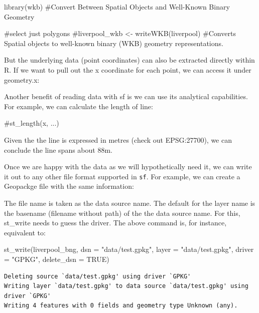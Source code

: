 \documentclass[
  letterpaper,
  DIV=11,
  numbers=noendperiod]{scrreprt}
\newenvironment{Shaded}{\begin{snugshade}}{\end{snugshade}}
\newcommand{\AttributeTok}[1]{\textcolor[rgb]{0.40,0.45,0.13}{#1}}
\newcommand{\CommentTok}[1]{\textcolor[rgb]{0.37,0.37,0.37}{#1}}
\newcommand{\ConstantTok}[1]{\textcolor[rgb]{0.56,0.35,0.01}{#1}}
\newcommand{\FunctionTok}[1]{\textcolor[rgb]{0.28,0.35,0.67}{#1}}
\newcommand{\NormalTok}[1]{\textcolor[rgb]{0.00,0.23,0.31}{#1}}
\newcommand{\StringTok}[1]{\textcolor[rgb]{0.13,0.47,0.30}{#1}}
\begin{document}
\begin{Shaded}
\begin{Highlighting}[]
\FunctionTok{library}\NormalTok{(wkb) }\CommentTok{\#Convert Between Spatial Objects and Well{-}Known Binary Geometry}

\CommentTok{\#select just polygons}
\CommentTok{\#liverpool\_wkb \textless{}{-} writeWKB(liverpool) \#Converts Spatial objects to well{-}known binary (WKB) geometry representations.}
\end{Highlighting}
\end{Shaded}

But the underlying data (point coordinates) can also be extracted
directly within R. If we want to pull out the x coordinate for each
point, we can access it under geometry.x:

Another benefit of reading data with sf is we can use its analytical
capabilities. For example, we can calculate the length of line:

\begin{Shaded}
\begin{Highlighting}[]
\CommentTok{\#st\_length(x, ...)}
\end{Highlighting}
\end{Shaded}

Given the the line is expressed in metres (check out EPSG:27700), we can
conclude the line spans about 88m.

Once we are happy with the data as we will hypothetically need it, we
can write it out to any other file format supported in \texttt{sf}. For
example, we can create a Geopackge file with the same information:

The file name is taken as the data source name. The default for the
layer name is the basename (filename without path) of the the data
source name. For this, st\_write needs to guess the driver. The above
command is, for instance, equivalent to:

\begin{Shaded}
\begin{Highlighting}[]
\FunctionTok{st\_write}\NormalTok{(liverpool\_bng, }\AttributeTok{dsn =} \StringTok{"data/test.gpkg"}\NormalTok{, }\AttributeTok{layer =} \StringTok{"data/test.gpkg"}\NormalTok{, }\AttributeTok{driver =} \StringTok{"GPKG"}\NormalTok{, }\AttributeTok{delete\_dsn =} \ConstantTok{TRUE}\NormalTok{)}
\end{Highlighting}
\end{Shaded}

\begin{verbatim}
Deleting source `data/test.gpkg' using driver `GPKG'
Writing layer `data/test.gpkg' to data source `data/test.gpkg' using driver `GPKG'
Writing 4 features with 0 fields and geometry type Unknown (any).
\end{verbatim}
\end{document}
